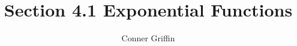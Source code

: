 \documentclass{ximera}
\title{Section 4.1 Exponential Functions}
\author{Conner Griffin}
\begin{document}
\begin{abstract}
    
\end{abstract}
\maketitle





\end{document}
